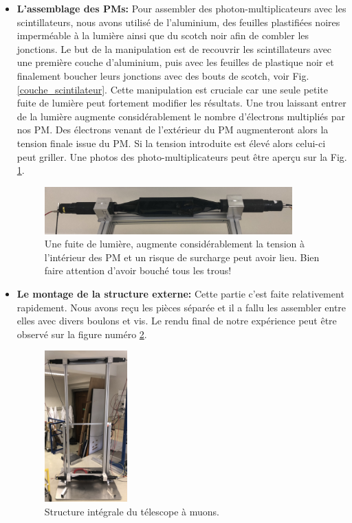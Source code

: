 \documentclass[12pt]{article}
\begin{document}
\begin{itemize}
    \item \textbf{L'assemblage des PMs: } Pour assembler des photon-multiplicateurs avec les scintillateurs, nous avons utilisé de l'aluminium, des feuilles plastifiées noires imperméable à la lumière ainsi que du scotch noir afin de combler les jonctions. Le but de la manipulation est de recouvrir les scintillateurs avec une première couche d'aluminium, puis avec les feuilles de plastique noir et finalement boucher leurs jonctions avec des bouts de scotch, voir Fig. \ref{couche_scintilateur}. Cette manipulation est cruciale car une seule petite fuite de lumière peut fortement modifier les résultats. Une trou laissant entrer de la lumière augmente considérablement le nombre d'électrons multipliés par nos PM. Des électrons venant de l'extérieur du PM augmenteront alors la tension finale issue du PM. Si la tension introduite est élevé alors celui-ci peut griller. Une photos des photo-multiplicateurs peut être aperçu sur la Fig. \ref{fig:PMS_photo}.
    
    \begin{figure}[htpb!]
        \centering
        \includegraphics[width=0.9\textwidth]{Images/Photos/PM_photo.jpg}
        \caption{Une fuite de lumière, augmente considérablement la tension à l'intérieur des PM et un risque de surcharge peut avoir lieu. Bien faire attention d'avoir bouché tous les trous!}
        \label{fig:PMS_photo}
    \end{figure}
    

    \item \textbf{Le montage de la structure externe: } Cette partie c'est faite relativement rapidement. Nous avons reçu les pièces séparée et il a fallu les assembler entre elles avec divers boulons et vis. Le rendu final de notre expérience peut être observé sur la figure numéro \ref{fig:Structure_integrale}.
    \begin{figure}[htpb!]
        \centering
        \includegraphics[width=0.3\textwidth]{Images/Photos/Structure_integrale_exp.jpg}
        \caption{Structure intégrale du télescope à muons.}
        \label{fig:Structure_integrale}
    \end{figure}
    
    \end{itemize}
\end{document}
